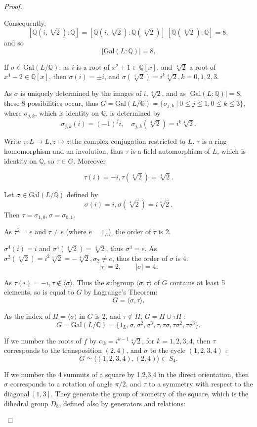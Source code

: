 \documentclass[11pt,a4paper]{article}
\newcommand{\Q}{\mathbb{Q}}
\newcommand{\Gal}{\mathrm{Gal}}
\begin{document}
\begin{proof}
\begin{enumerate}
Consequently, 
$$[\Q(i,\sqrt[4]{2}) : \Q] = [\Q(i,\sqrt[4]{2}) : \Q(\sqrt[4]{2})] \ [\Q(\sqrt[4]{2}) : \Q]  = 8,$$
and so
$$\vert \Gal(L:\Q) \vert = 8.$$

If $\sigma \in \Gal(L/\Q)$, as $i$ is a root of $x^2+1 \in \Q[x]$, and $\sqrt[4]{2}$ a root of $x^4-2 \in \Q[x]$, then $\sigma(i) = \pm i$, and $\sigma(\sqrt[4]{2}) = i^k \sqrt[4]{2},k=0,1,2,3$.

As $\sigma$ is uniquely determined by the images of $ i,\sqrt[4]{2}$, and as $\vert \Gal(L:\Q) \vert = 8$, these 8 possibilities occur, thus $G=\Gal(L/\Q) = \{\sigma_{j,k} \ \vert \ 0\leq j \leq1, 0 \leq k \leq 3 \}$, where $\sigma_{j,k}$, which is identity on $\Q$, is determined by
$$\sigma_{j,k}(i) = (-1)^j i,\quad \sigma_{j,k}(\sqrt[4]{2}) = i^k \sqrt[4]{2}.$$

Write $\tau :L \to L, z \mapsto \overline{z}$ the complex conjugation restricted to $L$. $\tau$ is a ring homomorphism and an involution, thus $\tau$ is a field automorphism of $L$, which is identity on $\Q$, so $\tau \in G$. Moreover 

$$ \tau(i) = -i, \tau(\sqrt[4]{2}) = \sqrt[4]{2}.$$

Let $\sigma \in \Gal(L/\Q)$ defined by $$\sigma(i)=i, \sigma(\sqrt[4]{2}) = i \sqrt[4]{2}.$$
Then  $\tau = \sigma_{1,0}, \sigma = \sigma_{0,1}$.

As $\tau^2 = e$ and $\tau \neq e$ (where $e = 1_L$), the order of $\tau$ is 2.

$\sigma^4(i) = i$ and $\sigma^4(\sqrt[4]{2}) = \sqrt[4]{2}$, thus $\sigma^4 = e$. As $\sigma^2(\sqrt[4]{2}) = i^2 \sqrt[4]{2}=-\sqrt[4]{2},\sigma_2 \neq e$, thus the order of $\sigma$ is 4.
$$|\tau| = 2, \qquad |\sigma| = 4.$$

As $\tau(i) = -i, \tau \not \in \langle \sigma \rangle$. Thus the subgroup $\langle \sigma, \tau \rangle$ of $G$ contains at least 5 elements, so is equal to $G$ by Lagrange's Theorem:
$$G = \langle \sigma, \tau \rangle.$$

As the index of  $H = \langle \sigma \rangle$ in $G$ is 2, and $\tau \not \in H$, $G = H \cup \tau H$ :
 $$ G=\Gal(L/\Q) = \{1_{L}, \sigma, \sigma^2, \sigma^3,\tau,  \tau \sigma, \tau \sigma^2, \tau \sigma^3\}.$$

If we number the roots of $f$ by  $\alpha_k=  i^{k-1} \sqrt[4]{2}$, for $k=1,2,3,4$, then $\tau$ corresponds to the transposition $(2,4)$, and $\sigma$ to the cycle $(1,2,3,4)$ :
$$G\simeq \langle(1,2,3,4),(2,4)\rangle \subset S_4.$$

If we number the 4 summits of a square by 1,2,3,4 in the direct orientation, then $\sigma$ corresponds to a rotation of angle $\pi/2$, and $\tau$ to a symmetry with respect to the diagonal $[1,3]$. They generate the group of isometry of the square, which is the dihedral group $D_8$, defined also by generators and relations:


\end{enumerate}
\end{proof}
\end{document}
